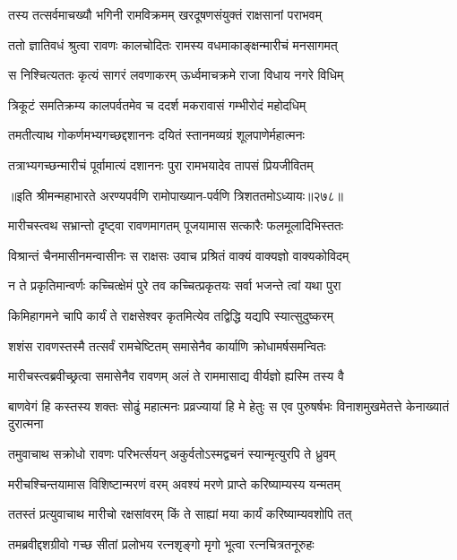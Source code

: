 \twolineshloka
{तस्य तत्सर्वमाचख्यौ भगिनी रामविक्रमम्}
{खरदूषणसंयुक्तं राक्षसानां पराभवम्}


\twolineshloka
{ततो ज्ञातिवधं श्रुत्वा रावणः कालचोदितः}
{रामस्य वधमाकाङ्क्षन्मारीचं मनसागमत्}


\twolineshloka
{स निश्चित्यततः कृत्यं सागरं लवणाकरम्}
{ऊर्ध्वमाचक्रमे राजा विधाय नगरे विधिम्}


\twolineshloka
{त्रिकूटं समतिक्रम्य कालपर्वतमेव च}
{ददर्श मकरावासं गम्भीरोदं महोदधिम्}


\twolineshloka
{तमतीत्याथ गोकर्णमभ्यगच्छद्दशाननः}
{दयितं स्तानमव्यग्रं शूलपाणेर्महात्मनः}


\twolineshloka
{तत्राभ्यगच्छन्मारीचं पूर्वामात्यं दशाननः}
{पुरा रामभयादेव तापसं प्रियजीवितम्}


॥इति श्रीमन्महाभारते अरण्यपर्वणि रामोपाख्यान-पर्वणि त्रिशततमोऽध्यायः॥२७८॥

\storymeta

\resetShloka



\twolineshloka
{मारीचस्त्वथ सभ्रान्तो दृष्ट्वा रावणमागतम्}
{पूजयामास सत्कारैः फलमूलादिभिस्ततः}


\twolineshloka
{विश्रान्तं चैनमासीनमन्वासीनः स राक्षसः}
{उवाच प्रश्रितं वाक्यं वाक्यज्ञो वाक्यकोविदम्}


\twolineshloka
{न ते प्रकृतिमान्वर्णः कच्चित्क्षेमं पुरे तव}
{कच्चित्प्रकृतयः सर्वा भजन्ते त्वां यथा पुरा}


\twolineshloka
{किमिहागमने चापि कार्यं ते राक्षसेश्वर}
{कृतमित्येव तद्विद्धि यद्यपि स्यात्सुदुष्करम्}


\twolineshloka
{शशंस रावणस्तस्मै तत्सर्वं रामचेष्टितम्}
{समासेनैव कार्याणि क्रोधामर्षसमन्वितः}


\twolineshloka
{मारीचस्त्वब्रवीच्छ्रत्वा समासेनैव रावणम्}
{अलं ते राममासाद्य वीर्यज्ञो ह्यस्मि तस्य वै}


\threelineshloka
{बाणवेगं हि कस्तस्य शक्तः सोढुं महात्मनः}
{प्रव्रज्यायां हि मे हेतुः स एव पुरुषर्षभः}
{विनाशमुखमेतत्ते केनाख्यातं दुरात्मना}


\twolineshloka
{तमुवाचाथ सक्रोधो रावणः परिभर्त्सयन्}
{अकुर्वतोऽस्मद्वचनं स्यान्मृत्युरपि ते ध्रुवम्}


\twolineshloka
{मरीचश्चिन्तयामास विशिष्टान्मरणं वरम्}
{अवश्यं मरणे प्राप्ते करिष्याम्यस्य यन्मतम्}


\twolineshloka
{ततस्तं प्रत्युवाचाथ मारीचो रक्षसांवरम्}
{किं ते साह्यां मया कार्यं करिष्याम्यवशोपि तत्}


\twolineshloka
{तमब्रवीद्दशग्रीवो गच्छ सीतां प्रलोभय}
{रत्नशृङ्गो मृगो भूत्वा रत्नचित्रतनूरुहः}


